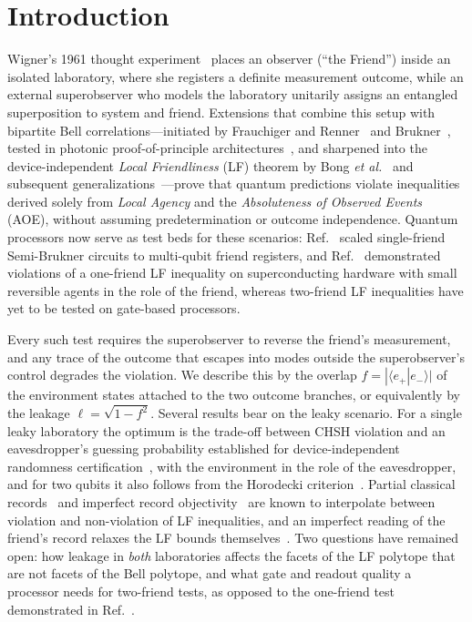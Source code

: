 \section{Introduction}
\label{sec:intro}

Wigner's 1961 thought experiment~\cite{wigner1961} places an observer (``the Friend'') inside an isolated laboratory, where she registers a definite measurement outcome, while an external superobserver who models the laboratory unitarily assigns an entangled superposition to system and friend. Extensions that combine this setup with bipartite Bell correlations---initiated by Frauchiger and Renner~\cite{frauchiger2018} and Brukner~\cite{brukner2018}, tested in photonic proof-of-principle architectures~\cite{proietti2019,bong2020}, and sharpened into the device-independent \emph{Local Friendliness} (LF) theorem by Bong \emph{et al.}~\cite{bong2020} and subsequent generalizations~\cite{wiseman2023,haddara2023}---prove that quantum predictions violate inequalities derived solely from \emph{Local Agency} and the \emph{Absoluteness of Observed Events} (AOE), without assuming predetermination or outcome independence. Quantum processors now serve as test beds for these scenarios: Ref.~\cite{zeng2024} scaled single-friend Semi-Brukner circuits to multi-qubit friend registers, and Ref.~\cite{laux2026} demonstrated violations of a one-friend LF inequality on superconducting hardware with small reversible agents in the role of the friend, whereas two-friend LF inequalities have yet to be tested on gate-based processors.

Every such test requires the superobserver to reverse the friend's measurement, and any trace of the outcome that escapes into modes outside the superobserver's control degrades the violation. We describe this by the overlap $f = |\langle e_+ | e_- \rangle|$ of the environment states attached to the two outcome branches, or equivalently by the leakage $\ell = \sqrt{1 - f^2}$. Several results bear on the leaky scenario. For a single leaky laboratory the optimum is the trade-off between CHSH violation and an eavesdropper's guessing probability established for device-independent randomness certification~\cite{pironio2010,masanes2011,acin2012}, with the environment in the role of the eavesdropper, and for two qubits it also follows from the Horodecki criterion~\cite{horodecki1995}. Partial classical records~\cite{baumann2023} and imperfect record objectivity~\cite{rivlin2025} are known to interpolate between violation and non-violation of LF inequalities, and an imperfect reading of the friend's record relaxes the LF bounds themselves~\cite{moreno2022}. Two questions have remained open: how leakage in \emph{both} laboratories affects the facets of the LF polytope that are not facets of the Bell polytope, and what gate and readout quality a processor needs for two-friend tests, as opposed to the one-friend test demonstrated in Ref.~\cite{laux2026}.


